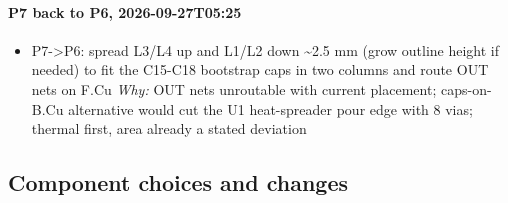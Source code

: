 \documentclass[11pt]{article}
\begin{document}
\paragraph*{P7 back to P6, 2026-09-27T05:25}
\begin{itemize}
\item P7-\textgreater{}P6: spread L3/L4 up and L1/L2 down \textasciitilde{}2.5 mm (grow outline height if needed) to fit the C15-C18 bootstrap caps in two columns and route OUT nets on F.Cu \emph{Why:} OUT nets unroutable with current placement; caps-on-B.Cu alternative would cut the U1 heat-spreader pour edge with 8 vias; thermal first, area already a stated deviation
\end{itemize}
\subsection*{Component choices and changes}
\end{document}

